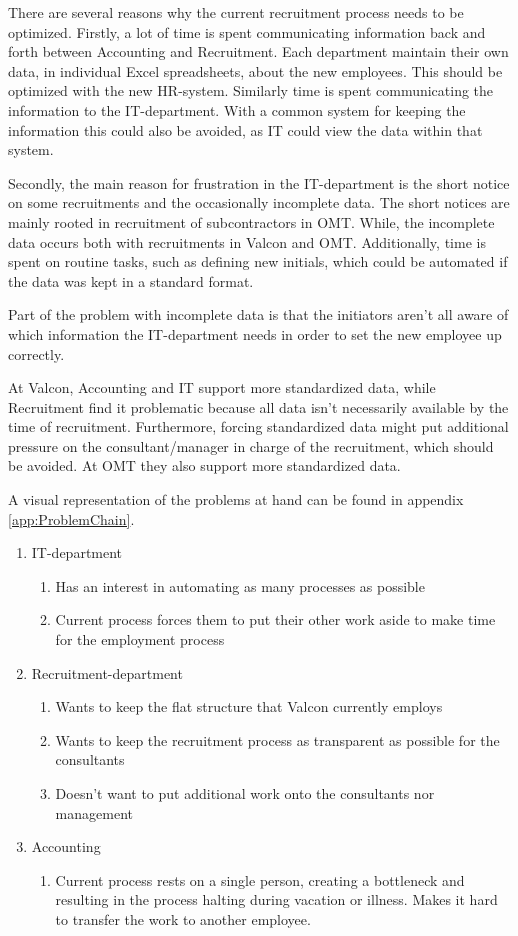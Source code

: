 There are several reasons why the current recruitment process needs to be optimized. 
Firstly, a lot of time is spent communicating information back and forth between Accounting and Recruitment. 
Each department maintain their own data, in individual Excel spreadsheets, about the new employees. 
This should be optimized with the new HR-system.
Similarly time is spent communicating the information to the IT-department.
With a common system for keeping the information this could also be avoided, as IT could view the data within that system.

Secondly, the main reason for frustration in the IT-department is the short notice on some recruitments and the occasionally incomplete data.
The short notices are mainly rooted in recruitment of subcontractors in OMT.
While, the incomplete data occurs both with recruitments in Valcon and OMT.
Additionally, time is spent on routine tasks, such as defining new initials, which could be automated if the data was kept in a standard format.

Part of the problem with incomplete data is that the initiators aren't all aware of which information the IT-department needs in order to set the new employee up correctly.

At Valcon, Accounting and IT support more standardized data, while Recruitment find it problematic because all data isn't necessarily available by the time of recruitment.
Furthermore, forcing standardized data might put additional pressure on the consultant/manager in charge of the recruitment, which should be avoided.
At OMT they also support more standardized data.

A visual representation of the problems at hand can be found in appendix \ref{app:ProblemChain}.

\begin{enumerate}
	\item IT-department
	\begin{enumerate}
		\item Has an interest in automating as many processes as possible
		\item Current process forces them to put their other work aside to make time for the employment process
	\end{enumerate}
	\item Recruitment-department
	\begin{enumerate}
		\item Wants to keep the flat structure that Valcon currently employs
		\item Wants to keep the recruitment process as transparent as possible for the consultants
		\item Doesn't want to put additional work onto the consultants nor management
	\end{enumerate}
	\item Accounting
	\begin{enumerate}
		\item Current process rests on a single person, creating a bottleneck and resulting in the process halting during vacation or illness. Makes it hard to transfer the work to another employee.
	\end{enumerate}
	
\end{enumerate}